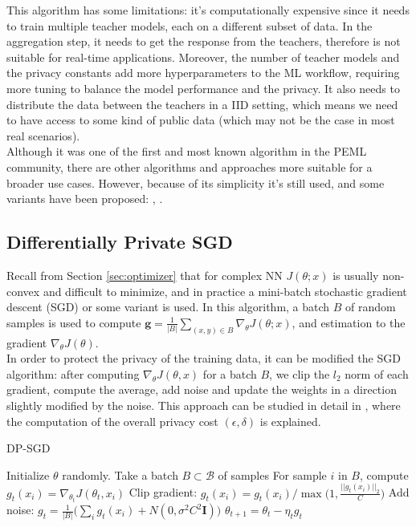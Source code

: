 This algorithm has some limitations: it's computationally expensive since it needs to train multiple teacher models, each on a different subset of data. In the aggregation step, it needs to get the response from the teachers, therefore is not suitable for real-time applications.
Moreover, the number of teacher models and the privacy constants add more hyperparameters to the ML workflow, requiring more tuning to balance the model performance and the privacy. It also needs to distribute the data between the teachers in a IID setting, which means we need to have access to some kind of public data (which may not be the case in most real scenarios).\\
Although it was one of the first and most known algorithm in the PEML community, there are other algorithms and approaches more suitable for a broader use cases. However, because of its simplicity it's still used, and some variants have been proposed: \cite{long}, \cite{jordon2019}.

\subsection{Differentially Private SGD}
Recall from Section \ref{sec:optimizer} that for complex NN $J(\theta; x)$ is usually non-convex and difficult to minimize, and in practice a mini-batch stochastic gradient descent (SGD) or some variant is used. In this algorithm, a batch $B$  of random samples is used to compute $\mathbf{g} = \frac{1}{|B|} \sum_{(x,y) \in B} \nabla_\theta J(\theta; x)$, and estimation to the gradient $\nabla_\theta J(\theta)$.\\
In order to protect the privacy of the training data, it can be modified the SGD algorithm: after computing $\nabla_\theta J(\theta, x)$ for a batch $B$, we clip the $l_2$ norm of each gradient, compute the average, add noise and update the weights in a direction slightly modified by the noise. This approach can be studied in detail in \cite{abadi2016}, where the computation of the overall privacy cost $(\epsilon, \delta)$ is explained.


\begin{algorithm}[H]
  \label{alg:DP_SGD}
  \caption{DP-SGD}
  \begin{algorithmic}[1]
    \State Initialize $\theta$ randomly.
      \State Take a batch $B \subset \mathcal{B}$ of samples
      \State For sample $i$ in $B$, compute $g_t(x_i) = \nabla_{\theta_t} J(\theta_t, x_i)$
      \State Clip gradient: $g_t(x_i) = g_t(x_i)/\max \bigl( 1, \frac{||g_t(x_i)||_2}{C} \bigr)$
      \State Add noise: $g_t = \frac{1}{|B|} \bigl( \sum_i g_t(x_i) + N(0, \sigma^2 C^2 \boldsymbol{I}) \bigr)$
      \State $\theta_{t+1} = \theta_t - \eta_t g_t$
    \EndFor
  \end{algorithmic}
\end{algorithm}

